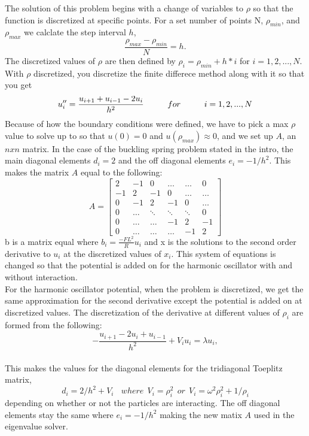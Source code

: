 \documentclass[%
 reprint,
 amsmath,amssymb,
 aps,
]{revtex4-1}
\begin{document}
The solution of this problem begins with a change of variables to $\rho$ so that the function is discretized at specific points. For a set number of points N, $\rho_{min}$, and $\rho_{max}$ we calclate the step interval $h$,
\[ \frac{\rho_{max} - \rho_{min}}{N} = h.  \]
The discretized values of $\rho$ are then defined by $\rho_i = \rho_{min} + h*i$ for $i = 1,2,...,N$. With $\rho$ discretized, you discretize the finite differece method along with it so that you get $$u_i'' = \frac{u_{i+1} + u_{i-1} - 2u_i}{h^2} \hspace{10mm} for \hspace{10mm}  i = 1,2,..., N$$
Because of how the boundary conditions were defined, we have to pick a max $\rho$ value to solve up to so that $u(0) = 0$ and $u(\rho_{max}) \approx 0$, and we set up $A$, an $nxn$ matrix. In the case of the buckling spring problem stated in the intro, the main diagonal elements $d_i = 2$ and the off diagonal elements $e_i = -1/h^2$. This makes the matrix $A$ equal to the following:
$$ A =
\begin{bmatrix}
    2 & -1 & 0 & \dots & \dots & 0 \\
    -1 & 2 & -1 & 0 & \dots  & \dots \\
    0 &-1 & 2 & -1 & 0  & \dots \\
    0 & \dots & \ddots & \ddots & \ddots & 0 \\
    0 & \dots & \dots& -1 & 2 & -1 \\
    0 & \dots & \dots & \dots& -1 & 2
\end{bmatrix} $$
 b is a matrix equal where $b_i = \frac{-FL^2}{R}u_i$ and x is the solutions to the second order derivative to $u_i$ at the discretized values of $x_i$. This system of equations is changed so that the potential is added on for the harmonic oscillator with and without interaction.\\
 
 For the harmonic oscillator potential, when the problem is discretized, we get the same approximation for the second derivative except the potential is added on at discretized values. The discretization of the derivative at different values of $\rho_i$ are formed from the following:
 \[
-\frac{u_{i+1} -2u_i +u_{i-1} }{h^2}+V_iu_i  = \lambda u_i,
\]
\\

This makes the values for the diagonal elements for the tridiagonal Toeplitz matrix,
\[ d_i = 2/h^2 + V_i \ \ \ \  where \ \ V_i = \rho_i^2 \ \ or \ \ V_i = \omega^2\rho_i^2 +1/\rho_i \]
depending on whether or not the particles are interacting. The off diagonal elements stay the same where $e_i = -1/h^2$ making the new matix $A$ used in the eigenvalue solver.
\end{document}
